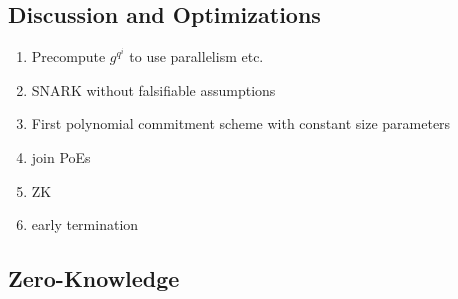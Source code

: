 \documentclass{article}
\theoremstyle{definition}
\begin{document}
\subsection{Discussion and Optimizations}
\begin{enumerate}
	\item Precompute $g^{q^i}$ to use parallelism etc.
	\item SNARK without falsifiable assumptions
	\item First polynomial commitment scheme with constant size parameters
	\item join PoEs
	\item ZK
	\item early termination
\end{enumerate}

\subsection{Zero-Knowledge}
\end{document}
